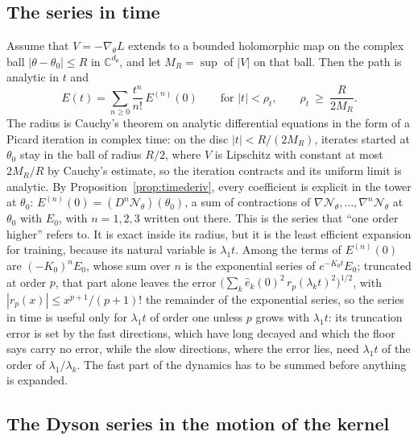 \documentclass[11pt]{article}
\theoremstyle{definition}
\theoremstyle{remark}
\newcommand{\Net}{\mathcal{N}_\theta}    %
\begin{document}
\subsection{The series in time}

Assume that $V = -\nabla_\theta L$ extends to a bounded holomorphic map on the complex ball $|\theta - \theta_0|\le R$ in $\mathbb{C}^{d_\theta}$, and let $M_R = \sup$ of $|V|$ on that ball.
Then the path is analytic in $t$ and
\begin{equation}\label{eq:timeseries}
E(t) = \sum_{n\ge0}\frac{t^n}{n!}\,E^{(n)}(0)\qquad\text{for }|t| < \rho_t,\qquad \rho_t\ \ge\ \frac{R}{2M_R} .
\end{equation}
The radius is Cauchy's theorem on analytic differential equations in the form of a Picard iteration in complex time: on the disc $|t| < R/(2M_R)$, iterates started at $\theta_0$ stay in the ball of radius $R/2$, where $V$ is Lipschitz with constant at most $2M_R/R$ by Cauchy's estimate, so the iteration contracts and its uniform limit is analytic.
By Proposition~\ref{prop:timederiv}, every coefficient is explicit in the tower at $\theta_0$: $E^{(n)}(0) = (D^n\Net)(\theta_0)$, a sum of contractions of $\nabla\Net,\dots,\nabla^n\Net$ at $\theta_0$ with $E_0$, with $n = 1, 2, 3$ written out there.
This is the series that ``one order higher'' refers to.
It is exact inside its radius, but it is the least efficient expansion for training, because its natural variable is $\lambda_1t$.
Among the terms of $E^{(n)}(0)$ are $(-K_0)^nE_0$, whose sum over $n$ is the exponential series of $e^{-K_0t}E_0$; truncated at order $p$, that part alone leaves the error $\big(\sum_k\hat e_k(0)^2\,r_p(\lambda_kt)^2\big)^{1/2}$, with $|r_p(x)|\le x^{p+1}/(p+1)!$ the remainder of the exponential series, so the series in time is useful only for $\lambda_1t$ of order one unless $p$ grows with $\lambda_1t$: its truncation error is set by the fast directions, which have long decayed and which the floor says carry no error, while the slow directions, where the error lies, need $\lambda_1t$ of the order of $\lambda_1/\lambda_k$.
The fast part of the dynamics has to be summed before anything is expanded.

\subsection{The Dyson series in the motion of the kernel}
\end{document}
